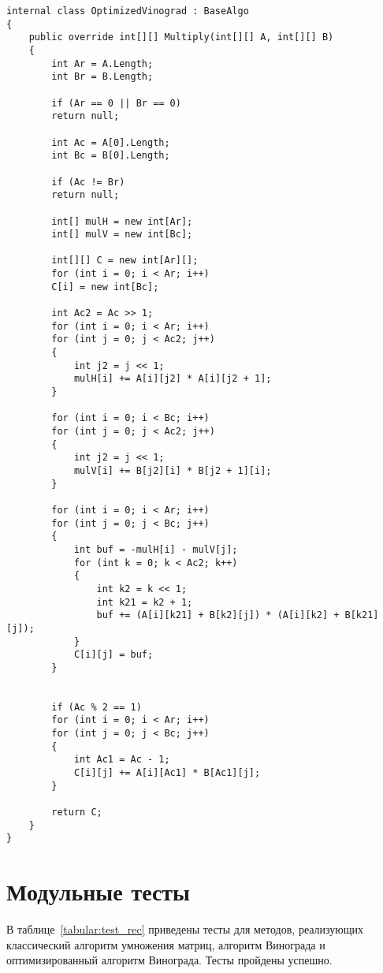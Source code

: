 \begin{lstlisting}[label=lst:optvino,caption=Класс с реализацией оптимизированного алгоритма Винограда]
internal class OptimizedVinograd : BaseAlgo
{
    public override int[][] Multiply(int[][] A, int[][] B)
	{
		int Ar = A.Length;
		int Br = B.Length;
		
		if (Ar == 0 || Br == 0)
		return null;
		
		int Ac = A[0].Length;
		int Bc = B[0].Length;
		
		if (Ac != Br)
		return null;
		
		int[] mulH = new int[Ar];
		int[] mulV = new int[Bc];
		
		int[][] C = new int[Ar][];
		for (int i = 0; i < Ar; i++)
		C[i] = new int[Bc];
		
		int Ac2 = Ac >> 1;
		for (int i = 0; i < Ar; i++)
		for (int j = 0; j < Ac2; j++)
		{
			int j2 = j << 1;
			mulH[i] += A[i][j2] * A[i][j2 + 1];
		}
		
		for (int i = 0; i < Bc; i++)
		for (int j = 0; j < Ac2; j++)
		{
			int j2 = j << 1;
			mulV[i] += B[j2][i] * B[j2 + 1][i];
		}
		
		for (int i = 0; i < Ar; i++)
		for (int j = 0; j < Bc; j++)
		{
			int buf = -mulH[i] - mulV[j];
			for (int k = 0; k < Ac2; k++)
			{
				int k2 = k << 1;
				int k21 = k2 + 1;
				buf += (A[i][k21] + B[k2][j]) * (A[i][k2] + B[k21][j]);
			}
			C[i][j] = buf;
		}
		
		
		if (Ac % 2 == 1)
		for (int i = 0; i < Ar; i++)
		for (int j = 0; j < Bc; j++)
		{
			int Ac1 = Ac - 1;
			C[i][j] += A[i][Ac1] * B[Ac1][j];
		}
		
		return C;
	}
}
\end{lstlisting}

\section{Модульные тесты}

В таблице~\ref{tabular:test_rec} приведены тесты для методов, реализующих классический алгоритм умножения матриц, алгоритм Винограда и оптимизированный алгоритм Винограда. Тесты пройдены успешно.

